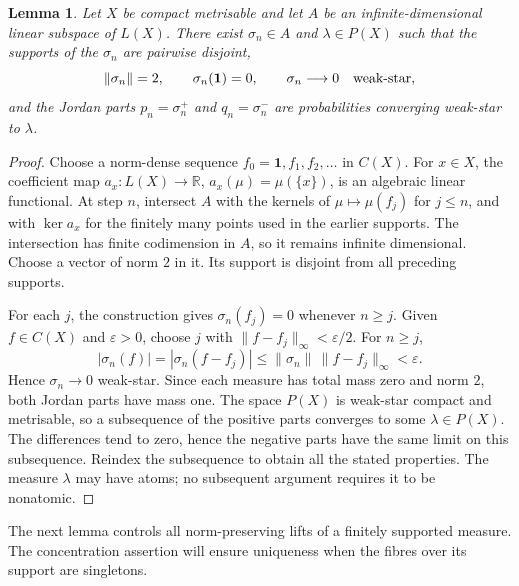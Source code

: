 \documentclass[a4paper,11pt]{amsart}
\theoremstyle{plain}
\newtheorem{lemma}[theorem]{Lemma}
\theoremstyle{definition}
\theoremstyle{remark}
\newcommand{\R}{\mathbb R}
\newcommand{\one}{\mathbf 1}
\newcommand{\eps}{\varepsilon}
\numberwithin{equation}{section}
\begin{document}
\begin{lemma}\label{lem:flat}
Let $X$ be compact metrisable and let $A$ be an infinite-dimensional linear subspace of $L(X)$. There exist $\sigma_n\in A$ and $\lambda\in P(X)$ such that the supports of the $\sigma_n$ are pairwise disjoint,
\[
\|\sigma_n\|=2,\qquad \sigma_n(\one)=0,\qquad
\sigma_n\longrightarrow0\quad\hbox{weak-star},
\]
and the Jordan parts $p_n=\sigma_n^+$ and $q_n=\sigma_n^-$ are probabilities converging weak-star to $\lambda$.
\end{lemma}
\begin{proof}
Choose a norm-dense sequence $f_0=\one,f_1,f_2,\ldots$ in $C(X)$. For $x\in X$, the coefficient map $a_x:L(X)\to\R$, $a_x(\mu)=\mu(\{x\})$, is an algebraic linear functional. At step $n$, intersect $A$ with the kernels of $\mu\mapsto\mu(f_j)$ for $j\leqslant n$, and with $\ker a_x$ for the finitely many points used in the earlier supports. The intersection has finite codimension in $A$, so it remains infinite dimensional. Choose a vector of norm $2$ in it. Its support is disjoint from all preceding supports.

For each $j$, the construction gives $\sigma_n(f_j)=0$ whenever $n\geqslant j$.
Given $f\in C(X)$ and $\eps>0$, choose $j$ with
$\|f-f_j\|_\infty<\eps/2$. For $n\geqslant j$,
\[
|\sigma_n(f)|=|\sigma_n(f-f_j)|
\leqslant\|\sigma_n\|\,\|f-f_j\|_\infty<\eps.
\]
Hence $\sigma_n\to0$ weak-star. Since each measure has total mass zero and norm $2$, both Jordan parts have mass one. The space $P(X)$ is weak-star compact and metrisable, so a subsequence of the positive parts converges to some $\lambda\in P(X)$. The differences tend to zero, hence the negative parts have the same limit on this subsequence. Reindex the subsequence to obtain all the stated properties. The measure $\lambda$ may have atoms; no subsequent argument requires it to be nonatomic.
\end{proof}

The next lemma controls all norm-preserving lifts of a finitely supported
measure. The concentration assertion will ensure uniqueness when the
fibres over its support are singletons.
\end{document}
